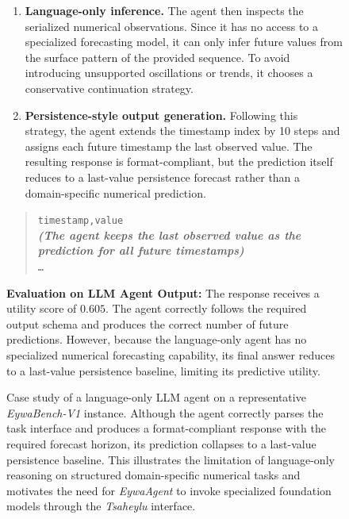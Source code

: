 \documentclass{llmxive}
\begin{document}
{\begin{figure}[!htbp]
{\begin{tcolorbox}[colback=gray!5!white, colframe=red!60, 
title=Case Study A.1: How LLM Agent Fails a Domain-Specific Problem, boxrule=0.3mm, width=1.2\textwidth, arc=2mm, auto outer arc=true]
\begin{enumerate}
    \item \textbf{Language-only inference.}
    The agent then inspects the serialized numerical observations. Since it has no access to a specialized forecasting model, it can only infer future values from the surface pattern of the provided sequence. To avoid introducing unsupported oscillations or trends, it chooses a conservative continuation strategy.

    \item \textbf{Persistence-style output generation.}
    Following this strategy, the agent extends the timestamp index by 10 steps and assigns each future timestamp the last observed value. The resulting response is format-compliant, but the prediction itself reduces to a last-value persistence forecast rather than a domain-specific numerical prediction.
\end{enumerate}

\begin{quote}
\small
\texttt{timestamp,value}\\
\textbf{\textit{(The agent keeps the last observed value as the prediction for all future timestamps)}}\\
\texttt{\ldots}
\end{quote}

\textbf{Evaluation on LLM Agent Output:}
The response receives a utility score of $0.605$. The agent correctly follows the required output schema and produces the correct number of future predictions. However, because the language-only agent has no specialized numerical forecasting capability, its final answer reduces to a last-value persistence baseline, limiting its predictive utility.


\end{tcolorbox}}
\caption{
Case study of a language-only LLM agent on a representative \textit{EywaBench-V1} instance. Although the agent correctly parses the task interface and produces a format-compliant response with the required forecast horizon, its prediction collapses to a last-value persistence baseline. This illustrates the limitation of language-only reasoning on structured domain-specific numerical tasks and motivates the need for \textit{EywaAgent} to invoke specialized foundation models through the \textit{Tsaheylu} interface.
}
\label{fig: case_study_llmagent}
\end{figure}






\begin{figure}[!htbp]
\centering
{}
\end{figure}}
\end{document}
